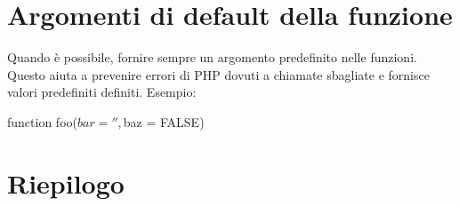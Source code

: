 \section{Argomenti di default della funzione}
Quando è possibile, fornire sempre un argomento predefinito nelle funzioni. Questo aiuta a prevenire errori di \ac{PHP} dovuti a chiamate sbagliate e fornisce valori predefiniti definiti. Esempio:

\begin{code}
function foo($bar = '', $baz = FALSE)
\end{code}

\section{Riepilogo}
\omissis